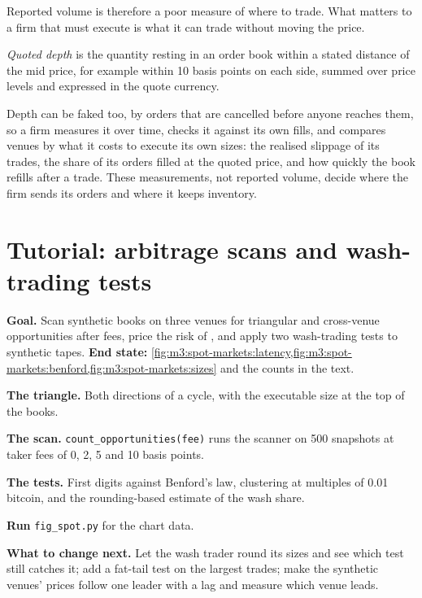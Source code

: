 Reported volume is therefore a poor measure of where to trade. What matters to a firm that must execute is what it
can trade without moving the price.

\begin{definition}\label{def:m3:spot-markets:depth}
\emph{Quoted depth} is the quantity resting in an order book within a stated distance of the
mid price, for example within 10 basis points on each side, summed over price levels and expressed in the quote
currency.
\end{definition}

Depth can be faked too, by orders that are cancelled before anyone reaches them, so a firm measures it over time,
checks it against its own fills, and compares venues by what it costs to execute its own sizes: the realised
slippage of its trades, the share of its orders filled at the quoted price, and how quickly the book refills after
a trade. These measurements, not reported volume, decide where the firm sends its orders and where it keeps
inventory.

\section{Tutorial: arbitrage scans and wash-trading tests}\label{tut:m3:spot-markets:scan}

\begin{tutorial}
\textbf{Goal.} Scan synthetic books on three venues for triangular and cross-venue opportunities after fees, price
the risk of , and apply two wash-trading tests to synthetic tapes. \textbf{End state:}
\cref{fig:m3:spot-markets:latency,fig:m3:spot-markets:benford,fig:m3:spot-markets:sizes} and the counts in the
text.
\begin{tutsteps}
\item \textbf{The triangle.} Both directions of a cycle, with the executable size at the top of the books.
\label{lst:m3:spot-markets:tri}
\item \textbf{The scan.} \texttt{count\_opportunities(fee)} runs the scanner on 500 snapshots at taker fees of 0,
2, 5 and 10 basis points.
\item \textbf{The tests.} First digits against Benford's law, clustering at multiples of 0.01 bitcoin, and the
rounding-based estimate of the wash share.
\label{lst:m3:spot-markets:wash}
\item \textbf{Run} \texttt{fig\_spot.py} for the chart data.
\end{tutsteps}
\textbf{What to change next.} Let the wash trader round its sizes and see which test still catches it; add a fat-tail
test on the largest trades; make the synthetic venues' prices follow one leader with a lag and measure which venue
leads.
\end{tutorial}

